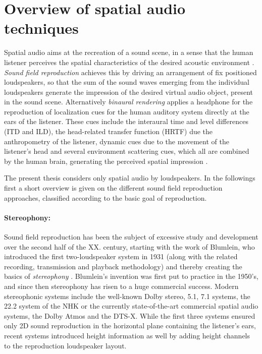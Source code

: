 \section{Overview of spatial audio techniques}
Spatial audio aims at the recreation of a sound scene, in a sense that the human listener perceives the spatial characteristics of the desired acoustic environment \cite{Zhang2017}.
\emph{Sound field reproduction} achieves this by driving an arrangement of fix positioned loudspeakers, so that the sum of the sound waves emerging from the individual loudspeakers generate the impression of the desired virtual audio object, present in the sound scene.
Alternatively \emph{binaural rendering} applies a headphone for the reproduction of localization cues for the human auditory system directly at the ears of the listener.
These cues include the interaural time and level differences (ITD and ILD), the head-related transfer function (HRTF) due the anthropometry of the listener, dynamic cues due to the movement of the listener's head and several environment scattering cues, which all are combined by the human brain, generating the perceived spatial impression \cite{Blauert1983}.

The present thesis considers only spatial audio by loudspeakers.
In the followings first a short overview is given on the different sound field reproduction approaches, classified according to the basic goal of reproduction.

\paragraph{Stereophony:}
Sound field reproduction has been the subject of excessive study and development over the second half of the XX. century, starting with the work of Blumlein, who introduced the first two-loudspeaker system in 1931 (along with the related recording, transmission and playback methodology) and thereby creating the basics of \emph{stereophony} \cite{Blumlein1932, Alexander2000}.
Blumlein's invention was first put to practice in the 1950's, and since then stereophony has risen to a huge commercial success.
Modern stereophonic systems include the well-known Dolby stereo, 5.1, 7.1 systems, the 22.2 system of the NHK \cite{hamasaki2005the, hamasaki2011the} or the currently state-of-the-art commercial spatial audio systems, the Dolby Atmos \cite{Atmos} and the DTS-X.
While the first three systems ensured only 2D sound reproduction in the horizontal plane containing the listener's ears, recent systems introduced height information as well by adding height channels to the reproduction loudspeaker layout.

